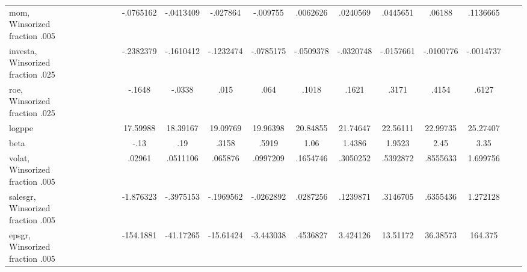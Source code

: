 {\begin{tabular}{l*{1}{ccccccccccccccccc}}
mom, Winsorized fraction .005&            &            &            &            &            &            &   -.0765162&   -.0413409&    -.027864&    -.009755&    .0062626&    .0240569&    .0445651&      .06188&    .1136665&            &            \\
investa, Winsorized fraction .025&            &            &            &            &            &            &   -.2382379&   -.1610412&   -.1232474&   -.0785175&   -.0509378&   -.0320748&   -.0157661&   -.0100776&   -.0014737&            &            \\
roe, Winsorized fraction .025&            &            &            &            &            &            &      -.1648&      -.0338&        .015&        .064&       .1018&       .1621&       .3171&       .4154&       .6127&            &            \\
logppe              &            &            &            &            &            &            &    17.59988&    18.39167&    19.09769&    19.96398&    20.84855&    21.74647&    22.56111&    22.99735&    25.27407&            &            \\
beta                &            &            &            &            &            &            &        -.13&         .19&       .3158&       .5919&        1.06&      1.4386&      1.9523&        2.45&        3.35&            &            \\
volat, Winsorized fraction .005&            &            &            &            &            &            &      .02961&    .0511106&     .065876&    .0997209&    .1654746&    .3050252&    .5392872&    .8555633&    1.699756&            &            \\
salesgr, Winsorized fraction .005&            &            &            &            &            &            &   -1.876323&   -.3975153&   -.1969562&   -.0262892&    .0287256&    .1239871&    .3146705&    .6355436&    1.272128&            &            \\
epsgr, Winsorized fraction .005&            &            &            &            &            &            &   -154.1881&   -41.17265&   -15.61424&   -3.443038&    .4536827&    3.424126&    13.51172&    36.38573&     164.375&            &            \\
\hline\hline
\end{tabular}
}
